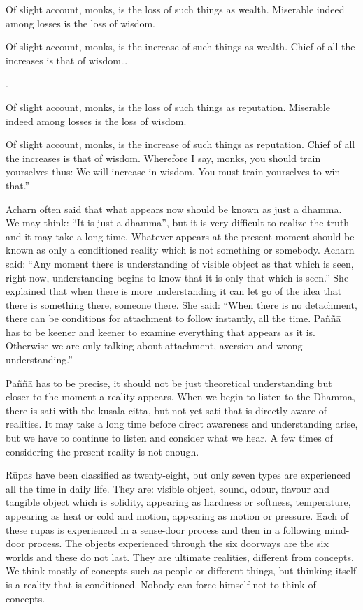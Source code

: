 {{{{{{Of slight account, monks, is the loss
of such things as wealth. Miserable indeed among losses is the loss of
wisdom.

Of slight account, monks, is the
increase of such things as wealth. Chief of all the increases is that of
wisdom\ldots{.

Of slight account, monks, is the loss of such things as reputation.
Miserable indeed among losses is the loss of wisdom.

Of slight account, monks, is the increase of such things as reputation.
Chief of all the increases is that of wisdom. Wherefore I say, monks,
you should train yourselves thus: We will increase in wisdom. You must
train yourselves to win that.''

Acharn often said that what appears now
should be known as just a dhamma. We may think: ``It is just a dhamma'',
but it is very difficult to realize the truth and it may take a long
time. Whatever appears at the present moment should be known as only a
conditioned reality which is not something or somebody. Acharn said:
``Any moment there is understanding of visible object as that which is
seen, right now, understanding begins to know that it is only that which
is seen.'' She explained that when there is more understanding it can
let go of the idea that there is something there, someone there. She
said: ``When there is no detachment, there can be conditions for
attachment to follow instantly, all the time. Paññā has to be keener and
keener to examine everything that appears as it is. Otherwise we are
only talking about attachment, aversion and wrong understanding.''

Paññā has to be precise, it should not
be just theoretical understanding but closer to the moment a reality
appears. When we begin to listen to the Dhamma, there is sati with the
kusala citta, but not yet sati that is directly aware of realities. It
may take a long time before direct awareness and understanding arise,
but we have to continue to listen and consider what we hear. A few times
of considering the present reality is not enough. 

Rūpas have been classified as
twenty-eight, but only seven types are experienced all the time in daily
life. They are: visible object, sound, odour, flavour and tangible
object which is solidity, appearing as hardness or softness,
temperature, appearing as heat or cold and motion, appearing as motion
or pressure. Each of these rūpas is experienced in a sense-door process
and then in a following mind-door process. The objects experienced
through the six doorways are the six worlds and these do not last. They
are ultimate realities, different from concepts. We think mostly of
concepts such as people or different things, but thinking itself is a
reality that is conditioned. Nobody can force himself not to think of
concepts. 

}}}}}}}
